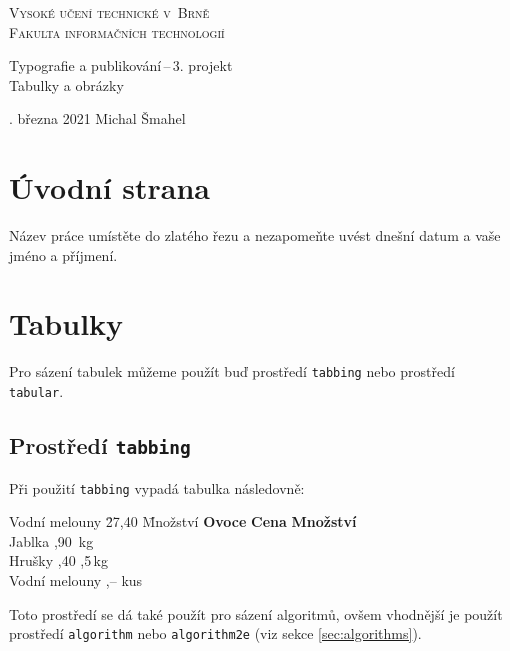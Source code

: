 \documentclass[a4paper, 11pt, final]{article}
\begin{document}
\begin{titlepage}
\begin{center}
    \Huge \textsc{Vysoké učení technické v~Brně}\\
    \huge \textsc{Fakulta informačních technologií}
    
    
    \LARGE Typografie a publikování\,--\,3. projekt\\
    \Huge Tabulky a obrázky
    
\end{center}

\Large {}. března 2021 \hfill Michal Šmahel
\end{titlepage}

\section{Úvodní strana}

Název práce umístěte do zlatého řezu a nezapomeňte uvést dnešní datum a vaše jméno a příjmení.

\section{Tabulky}

Pro sázení tabulek můžeme použít buď prostředí \texttt{tabbing} nebo prostředí \texttt{tabular}.

\subsection{Prostředí \texttt{tabbing}}

Při použití \texttt{tabbing} vypadá tabulka následovně:

\begin{tabbing}
    Vodní melouny \quad \= 27,40 \quad \= Množství     \kill
    \textbf{Ovoce} \> \textbf{Cena} \> \textbf{Množství} \\
    Jablka         ,90         \,kg             \\
    Hrušky         ,40         ,5\,kg           \\
    Vodní melouny  ,--          kus             \\
\end{tabbing}

\noindent Toto prostředí se dá také použít pro sázení algoritmů, ovšem vhodnější je použít 
prostředí \texttt{algorithm} nebo \texttt{algorithm2e} (viz sekce \ref{sec:algorithms}).
\end{document}
